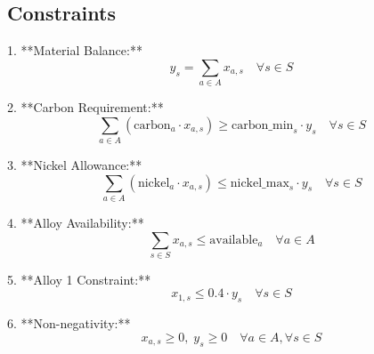 \documentclass{article}
\begin{document}
\subsection*{Constraints}
1. **Material Balance:**
\[
y_s = \sum_{a \in A} x_{a,s} \quad \forall s \in S
\]

2. **Carbon Requirement:**
\[
\sum_{a \in A} \left( \text{carbon}_a \cdot x_{a,s} \right) \geq \text{carbon\_min}_s \cdot y_s \quad \forall s \in S
\]

3. **Nickel Allowance:**
\[
\sum_{a \in A} \left( \text{nickel}_a \cdot x_{a,s} \right) \leq \text{nickel\_max}_s \cdot y_s \quad \forall s \in S
\]

4. **Alloy Availability:**
\[
\sum_{s \in S} x_{a,s} \leq \text{available}_a \quad \forall a \in A
\]

5. **Alloy 1 Constraint:**
\[
x_{1,s} \leq 0.4 \cdot y_s \quad \forall s \in S
\]

6. **Non-negativity:**
\[
x_{a,s} \geq 0, \; y_s \geq 0 \quad \forall a \in A, \forall s \in S
\]
\end{document}
